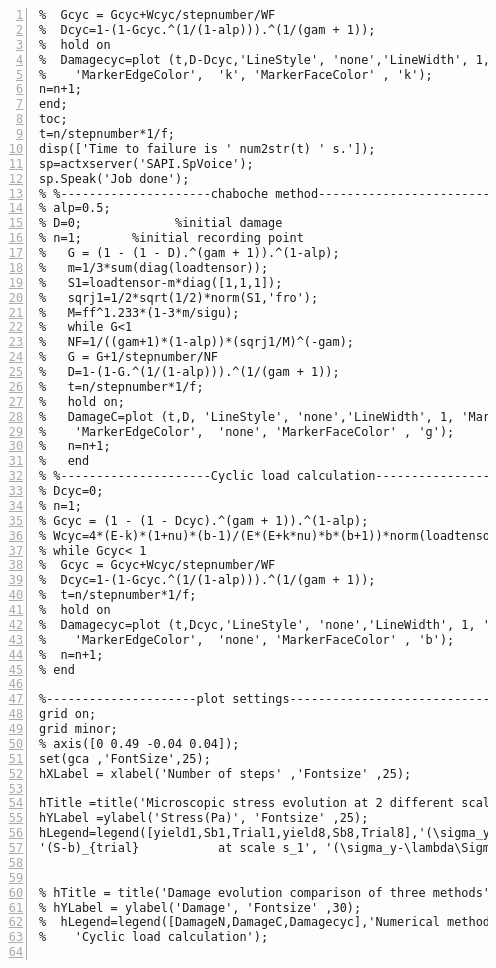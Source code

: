 \begin{lstlisting}[numbers=left, numberstyle=\tiny, keywordstyle=\color{blue!100}, commentstyle=\color{red!30!green!100!blue!100}, frame=shadowbox, rulesepcolor=\color{red!20!green!20!blue!20}]
%---------------------Difference between cyclic load calculation and numerical method as function of time-----------------------------
%  Gcyc = Gcyc+Wcyc/stepnumber/WF
%  Dcyc=1-(1-Gcyc.^(1/(1-alp))).^(1/(gam + 1));
%  hold on
%  Damagecyc=plot (t,D-Dcyc,'LineStyle', 'none','LineWidth', 1, 'Marker', 'o', 'MarkerSize', 6, ...
%    'MarkerEdgeColor',  'k', 'MarkerFaceColor' , 'k');
n=n+1;
end;
toc;
t=n/stepnumber*1/f;
disp(['Time to failure is ' num2str(t) ' s.']);
sp=actxserver('SAPI.SpVoice');
sp.Speak('Job done');
% %---------------------chaboche method-----------------------------
% alp=0.5;
% D=0;             %initial damage
% n=1;       %initial recording point
%   G = (1 - (1 - D).^(gam + 1)).^(1-alp);
%   m=1/3*sum(diag(loadtensor));
%   S1=loadtensor-m*diag([1,1,1]);
%   sqrj1=1/2*sqrt(1/2)*norm(S1,'fro');
%   M=ff^1.233*(1-3*m/sigu);
%   while G<1
%   NF=1/((gam+1)*(1-alp))*(sqrj1/M)^(-gam);
%   G = G+1/stepnumber/NF
%   D=1-(1-G.^(1/(1-alp))).^(1/(gam + 1));
%   t=n/stepnumber*1/f;
%   hold on;
%   DamageC=plot (t,D, 'LineStyle', 'none','LineWidth', 1, 'Marker', 'o', 'MarkerSize', 6, ...
%    'MarkerEdgeColor',  'none', 'MarkerFaceColor' , 'g');
%   n=n+1;
%   end
% %---------------------Cyclic load calculation-----------------------------
% Dcyc=0;
% n=1;
% Gcyc = (1 - (1 - Dcyc).^(gam + 1)).^(1-alp);
% Wcyc=4*(E-k)*(1+nu)*(b-1)/(E*(E+k*nu)*b*(b+1))*norm(loadtensor-(1/3*sum(diag(loadtensor)))*diag([1,1,1]),'fro').^(b+1)*y.^(1-b) ;
% while Gcyc< 1
%  Gcyc = Gcyc+Wcyc/stepnumber/WF
%  Dcyc=1-(1-Gcyc.^(1/(1-alp))).^(1/(gam + 1));
%  t=n/stepnumber*1/f;
%  hold on
%  Damagecyc=plot (t,Dcyc,'LineStyle', 'none','LineWidth', 1, 'Marker', 'o', 'MarkerSize', 6, ...
%    'MarkerEdgeColor',  'none', 'MarkerFaceColor' , 'b');
%  n=n+1;
% end

%---------------------plot settings-----------------------------
grid on;
grid minor;
% axis([0 0.49 -0.04 0.04]);
set(gca ,'FontSize',25);
hXLabel = xlabel('Number of steps' ,'Fontsize' ,25);

hTitle =title('Microscopic stress evolution at 2 different scales ' ,'Fontsize' ,25);
hYLabel =ylabel('Stress(Pa)', 'Fontsize' ,25);
hLegend=legend([yield1,Sb1,Trial1,yield8,Sb8,Trial8],'(\sigma_y-\lambda\Sigma_H)/s_1     at scale s_1','(S-b)               at scale s_1',...
'(S-b)_{trial}           at scale s_1', '(\sigma_y-\lambda\Sigma_H)/s_8     at scale s_{8}','(S-b)               at scale s_{8}','(S-b)_{trial}           at scale s_{8}');


% hTitle = title('Damage evolution comparison of three methods' ,'Fontsize' ,30);
% hYLabel = ylabel('Damage', 'Fontsize' ,30);
%  hLegend=legend([DamageN,DamageC,Damagecyc],'Numerical method','Chaboche method',...
%    'Cyclic load calculation');


\end{lstlisting}
